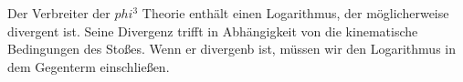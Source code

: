 \documentclass{article}
\begin{document}
Der Verbreiter der $phi^3$ Theorie enthält einen Logarithmus, der möglicherweise divergent ist. Seine Divergenz trifft in Abhängigkeit von die kinematische Bedingungen des Stoßes. Wenn er divergenb ist, müssen wir den Logarithmus in dem Gegenterm einschließen.
\end{document}
